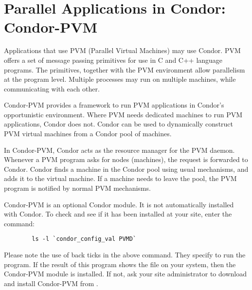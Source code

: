 \section{\label{sec:PVM}Parallel Applications in Condor: Condor-PVM}

\newcommand{\func}[1]{\texttt{#1}}

Applications that use PVM (Parallel Virtual Machines) may use
Condor.
PVM offers a set of message passing primitives for use in
C and C++ language programs.
The primitives, together with the PVM environment
allow parallelism at the program level.
Multiple processes
may run on multiple machines,
while communicating with each other.

Condor-PVM provides a framework to run PVM applications
in Condor's opportunistic environment.
Where PVM needs dedicated machines
to run PVM applications, Condor does not.
Condor can be used to dynamically 
construct PVM virtual machines from a Condor pool of machines.

In Condor-PVM, Condor acts as the
resource manager for the PVM daemon.  Whenever a PVM program asks
for nodes (machines), the request is forwarded to Condor.
Condor finds a machine in the Condor pool using usual mechanisms,
and adds it to the virtual machine.
If a machine needs to leave the pool, the
PVM program is notified by normal PVM mechanisms.


\Note Condor-PVM is an optional Condor module.  It is not
automatically installed with Condor. To check and see if
it has been installed at your site, enter the command:
\begin{verbatim}
        ls -l `condor_config_val PVMD`
\end{verbatim}
Please note the use of back ticks in the above command.
They specify to run the  program.
If the result of this program shows the
file  on your system, then the Condor-PVM module
is installed.
If not,
ask your site administrator to download and install Condor-PVM from
.

